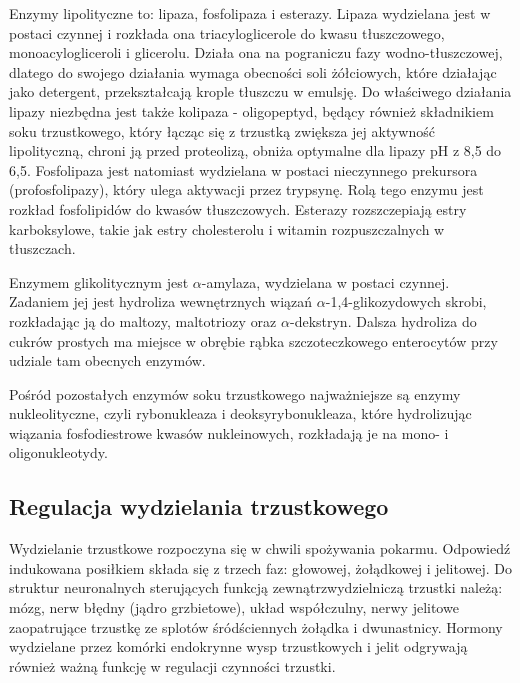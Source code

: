 \documentclass[a4paper, 12pt]{report}
\begin{document}
Enzymy lipolityczne to: lipaza, fosfolipaza i esterazy. Lipaza
wydzielana jest w postaci czynnej i rozkłada ona triacyloglicerole do
kwasu tłuszczowego, monoacylogliceroli i glicerolu. Działa ona na
pograniczu fazy wodno-tłuszczowej, dlatego do swojego działania wymaga
obecności soli żółciowych, które działając jako detergent,
przekształcają krople tłuszczu w emulsję. Do właściwego działania
lipazy niezbędna jest także kolipaza - oligopeptyd, będący również
składnikiem soku trzustkowego, który łącząc się z trzustką zwiększa
jej aktywność lipolityczną, chroni ją przed proteolizą, obniża
optymalne dla lipazy pH z 8,5 do 6,5. Fosfolipaza jest natomiast
wydzielana w postaci nieczynnego prekursora (profosfolipazy), który
ulega aktywacji przez trypsynę. Rolą tego enzymu jest rozkład
fosfolipidów do kwasów tłuszczowych. Esterazy rozszczepiają estry
karboksylowe, takie jak estry cholesterolu i witamin rozpuszczalnych w
tłuszczach.

Enzymem glikolitycznym jest $\alpha$-amylaza, wydzielana w postaci
czynnej. Zadaniem jej jest hydroliza wewnętrznych wiązań
$\alpha$-1,4-glikozydowych skrobi, rozkładając ją do maltozy,
maltotriozy oraz $\alpha$-dekstryn. Dalsza hydroliza do cukrów
prostych ma miejsce w obrębie rąbka szczoteczkowego enterocytów przy
udziale tam obecnych enzymów.

Pośród pozostałych enzymów soku trzustkowego najważniejsze są enzymy
nukleolityczne, czyli rybonukleaza i deoksyrybonukleaza, które
hydrolizując wiązania fosfodiestrowe kwasów nukleinowych, rozkładają
je na mono- i oligonukleotydy.

\subsection{Regulacja wydzielania trzustkowego}
Wydzielanie trzustkowe rozpoczyna się w chwili spożywania
pokarmu. Odpowiedź indukowana posiłkiem składa się z trzech faz:
głowowej, żołądkowej i jelitowej. Do struktur neuronalnych
sterujących funkcją zewnątrzwydzielniczą trzustki należą: mózg, nerw
błędny (jądro grzbietowe), układ współczulny, nerwy jelitowe
zaopatrujące trzustkę ze splotów śródściennych żołądka i dwunastnicy.
Hormony wydzielane przez komórki endokrynne wysp trzustkowych i jelit
odgrywają również ważną funkcję w regulacji czynności trzustki.
\end{document}
